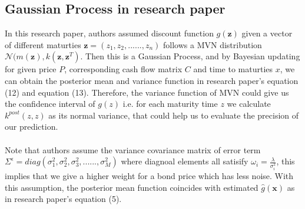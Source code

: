 \subsection{Gaussian Process in research paper}
In this research paper, authors assumed discount function $g(\boldsymbol{z})$ given a vector of different maturties $\boldsymbol{z} = (z_1, z_2, ......, z_n)$ follows a MVN distribution $\mathcal{N}(m(\boldsymbol{z}), k(\boldsymbol{z}, \boldsymbol{z}^T)$. Then this is a Gaussian Process, and by Bayesian updating for given price $P$, corresponding cash flow matrix $C$ and time to maturties $x$, we can obtain the posterior mean and variance function in research paper's equation (12) and equation (13). Therefore, the variance function of MVN could give us the confidence interval of $g(z)$ i.e. for each maturity time $z$ we calculate $k^{post}(z,z)$ as its normal variance, that could help us to evaluate the precision of our prediction. \\ \\
Note that authors assume the variance covariance matrix of error term $\varSigma^{\epsilon} = diag(\sigma_{1}^{2}, \sigma_{2}^{2}, \sigma_{3}^{2}, ......, \sigma_{M}^{2}) $ where diagnoal elements all satisify $\omega_i = \frac{\lambda}{\sigma_{i}^{2}}$, this implies that we give a higher weight for a bond price which has less noise. With this assumption, the posterior mean function coincides with estimated $\hat{g}(\boldsymbol{x})$ as in research paper's equation (5). 




